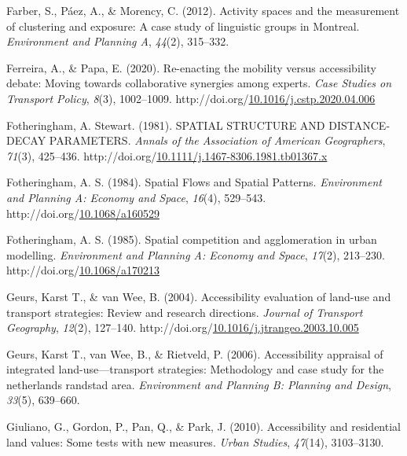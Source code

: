 \documentclass[
11pt, %
oneside, %
english, %
singlespacing, %
]{macthesis} %
\newlength{\cslhangindent}
\newenvironment{CSLReferences}[2] %
{\begin{list}{}{%
	\setlength{\itemindent}{0pt}
	\setlength{\leftmargin}{0pt}
	\setlength{\parsep}{0pt}
	\ifodd #1
	\setlength{\leftmargin}{\cslhangindent}
	\setlength{\itemindent}{-1\cslhangindent}
	\fi
	\setlength{\itemsep}{#2\baselineskip}}}
{\end{list}}
\begin{document}
\begin{CSLReferences}{1}{0}
Farber, S., Páez, A., \& Morency, C. (2012). Activity spaces and the measurement of clustering and exposure: A case study of linguistic groups in {Montreal}. \emph{Environment and Planning A}, \emph{44}(2), 315--332.

Ferreira, A., \& Papa, E. (2020). Re-enacting the mobility versus accessibility debate: Moving towards collaborative synergies among experts. \emph{Case Studies on Transport Policy}, \emph{8}(3), 1002--1009. http://doi.org/\href{https://doi.org/10.1016/j.cstp.2020.04.006}{10.1016/j.cstp.2020.04.006}

Fotheringham, A. Stewart. (1981). {SPATIAL} {STRUCTURE} {AND} {DISTANCE}‐{DECAY} {PARAMETERS}. \emph{Annals of the Association of American Geographers}, \emph{71}(3), 425--436. http://doi.org/\href{https://doi.org/10.1111/j.1467-8306.1981.tb01367.x}{10.1111/j.1467-8306.1981.tb01367.x}

Fotheringham, A. S. (1984). Spatial {Flows} and {Spatial} {Patterns}. \emph{Environment and Planning A: Economy and Space}, \emph{16}(4), 529--543. http://doi.org/\href{https://doi.org/10.1068/a160529}{10.1068/a160529}

Fotheringham, A. S. (1985). Spatial competition and agglomeration in urban modelling. \emph{Environment and Planning A: Economy and Space}, \emph{17}(2), 213--230. http://doi.org/\href{https://doi.org/10.1068/a170213}{10.1068/a170213}

Geurs, Karst T., \& van Wee, B. (2004). Accessibility evaluation of land-use and transport strategies: Review and research directions. \emph{Journal of Transport Geography}, \emph{12}(2), 127--140. http://doi.org/\href{https://doi.org/10.1016/j.jtrangeo.2003.10.005}{10.1016/j.jtrangeo.2003.10.005}

Geurs, Karst T., van Wee, B., \& Rietveld, P. (2006). Accessibility appraisal of integrated land-use---transport strategies: Methodology and case study for the netherlands randstad area. \emph{Environment and Planning B: Planning and Design}, \emph{33}(5), 639--660.

Giuliano, G., Gordon, P., Pan, Q., \& Park, J. (2010). Accessibility and residential land values: Some tests with new measures. \emph{Urban Studies}, \emph{47}(14), 3103--3130.


\end{CSLReferences}
\end{document}
